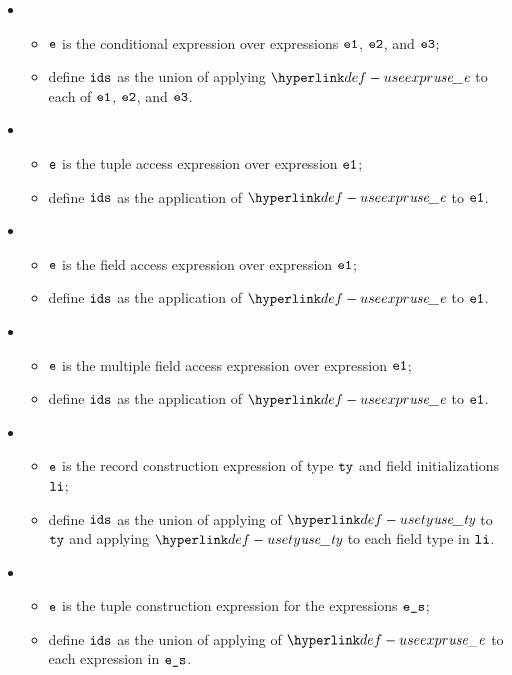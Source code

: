 \begin{itemize}
  \item {}
  \begin{itemize}
    \item $\texttt{e}$ is the conditional expression over expressions $\texttt{e1}$, $\texttt{e2}$, and $\texttt{e3}$;
    \item define $\texttt{ids}$ as the union of applying $\useexpr$ to each of $\texttt{e1}$, $\texttt{e2}$, and $\texttt{e3}$.
  \end{itemize}

  \item {}
  \begin{itemize}
    \item $\texttt{e}$ is the tuple access expression over expression $\texttt{e1}$;
    \item define $\texttt{ids}$ as the application of $\useexpr$ to $\texttt{e1}$.
  \end{itemize}

  \item {}
  \begin{itemize}
    \item $\texttt{e}$ is the field access expression over expression $\texttt{e1}$;
    \item define $\texttt{ids}$ as the application of $\useexpr$ to $\texttt{e1}$.
  \end{itemize}

  \item {}
  \begin{itemize}
    \item $\texttt{e}$ is the multiple field access expression over expression $\texttt{e1}$;
    \item define $\texttt{ids}$ as the application of $\useexpr$ to $\texttt{e1}$.
  \end{itemize}

  \item {}
  \begin{itemize}
    \item $\texttt{e}$ is the record construction expression of type $\texttt{ty}$ and field initializations $\texttt{li}$;
    \item define $\texttt{ids}$ as the union of applying of $\usety$ to $\texttt{ty}$ and applying $\usety$ to each field type in $\texttt{li}$.
  \end{itemize}

  \item {}
  \begin{itemize}
    \item $\texttt{e}$ is the tuple construction expression for the expressions $\texttt{e\_s}$;
    \item define $\texttt{ids}$ as the union of applying of $\useexpr$ to each expression in $\texttt{e\_s}$.
  \end{itemize}


\end{itemize}
